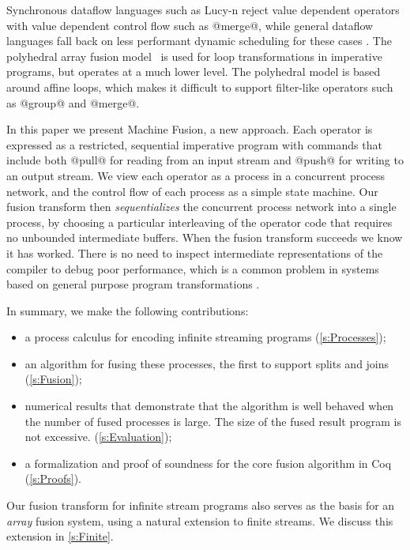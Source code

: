 Synchronous dataflow languages such as Lucy-n \cite{mandel2010lucy} reject value dependent operators with value dependent control flow such as @merge@, while general dataflow languages fall back on less performant dynamic scheduling for these cases \cite{bouakaz2013real}.
The polyhedral array fusion model~\cite{feautrier2011polyhedron} is used for loop transformations in imperative programs, but operates at a much lower level. The polyhedral model is based around affine loops, which makes it difficult to support filter-like operators such as @group@ and @merge@.

In this paper we present Machine Fusion, a new approach. Each operator is expressed as a restricted, sequential imperative program with commands that include both @pull@ for reading from an input stream and @push@ for writing to an output stream. We view each operator as a process in a concurrent process network, and the control flow of each process as a simple state machine. Our fusion transform then \emph{sequentializes} the concurrent process network into a single process, by choosing a particular interleaving of the operator code that requires no unbounded intermediate buffers. When the fusion transform succeeds we know it has worked. There is no need to inspect intermediate representations of the compiler to debug poor performance, which is a common problem in systems based on general purpose program transformations \cite{lippmeier2012guiding}.

In summary, we make the following contributions:
\begin{itemize}
\item a process calculus for encoding infinite streaming programs (\cref{s:Processes});
\item an algorithm for fusing these processes, the first to support splits and joins (\cref{s:Fusion});
\item numerical results that demonstrate that the algorithm is well behaved when the number of fused processes is large. The size of the fused result program is not excessive. (\cref{s:Evaluation});
\item a formalization and proof of soundness for the core fusion algorithm in Coq (\cref{s:Proofs}).
\end{itemize}

Our fusion transform for infinite stream programs also serves as the basis for an \emph{array} fusion system, using a natural extension to finite streams. We discuss this extension in \cref{s:Finite}.

